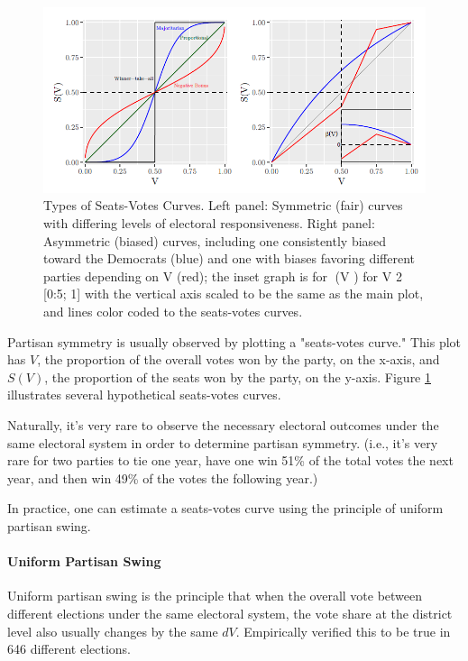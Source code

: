 \begin{figure}
    \includegraphics[width=0.8\linewidth]{img/seatsvotes.png}
    \caption{Types of Seats-Votes Curves. Left panel: Symmetric (fair) curves with differing
    levels of electoral responsiveness. Right panel: Asymmetric (biased) curves, including
    one consistently biased toward the Democrats (blue) and one with biases favoring different
    parties depending on V (red); the inset graph is for (V ) for V 2 [0:5; 1] with the vertical
    axis scaled to be the same as the main plot, and lines color coded to the seats-votes curves. \parencite[175]{katz2020}}
    \label{fig:seatsvotes1}
\end{figure}

Partisan symmetry is usually observed by plotting a "seats-votes curve." This plot has $V$, the proportion of the overall votes won by the party, on the x-axis, and $S(V)$, the proportion of the seats won by the party, on the y-axis. Figure \ref{fig:seatsvotes1} \parencite[175]{katz2020} illustrates several hypothetical seats-votes curves.

Naturally, it's very rare to observe the necessary electoral outcomes under the same electoral system in order to determine partisan symmetry. (i.e., it's very rare for two parties to tie one year, have one win 51\% of the total votes the next year, and then win 49\% of the votes the following year.)

In practice, one can estimate a seats-votes curve using the principle of uniform partisan swing.

\paragraph{Uniform Partisan Swing}

Uniform partisan swing is the principle that when the overall vote between different elections under the same electoral system, the vote share at the district level also usually changes by the same $dV$. \textcite{katz2020} Empirically verified this to be true in 646 different elections. 

